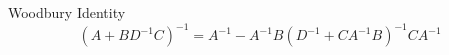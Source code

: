 \newcommand{\inv}{^{-1}}
\newcommand{\Gauss}[1]{\mathcal{N}(#1)}
\newcommand{\Ex}[1]{\mathbb{E}[#1]}

\newcommand{\vvec}[2]{\begin{pmatrix} #1 \\ #2 \end{pmatrix}}
\newcommand{\hvec}[2]{\begin{pmatrix} #1 & #2 \end{pmatrix}}
\newcommand{\matt}[4]{\begin{pmatrix} #1 & #2 \\ #3 & #4 \end{pmatrix}}



\begin{itembox}[l]{Woodbury Identity}
\[ (A + B D\inv C)\inv = A\inv - A\inv B (D\inv + C A\inv B)\inv C A\inv \]
\end{itembox}
